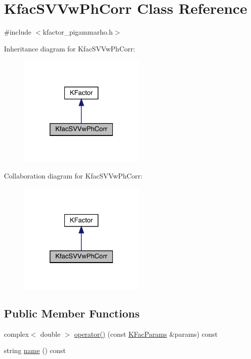 \hypertarget{classKfacSVVwPhCorr}{}\section{Kfac\+S\+V\+Vw\+Ph\+Corr Class Reference}
\label{classKfacSVVwPhCorr}


{\ttfamily \#include $<$kfactor\+\_\+pigammarho.\+h$>$}



Inheritance diagram for Kfac\+S\+V\+Vw\+Ph\+Corr\+:
\nopagebreak
\begin{figure}[H]
\begin{center}
\leavevmode
\includegraphics[width=175pt]{d2/d39/classKfacSVVwPhCorr__inherit__graph}
\end{center}
\end{figure}


Collaboration diagram for Kfac\+S\+V\+Vw\+Ph\+Corr\+:
\nopagebreak
\begin{figure}[H]
\begin{center}
\leavevmode
\includegraphics[width=175pt]{d9/df8/classKfacSVVwPhCorr__coll__graph}
\end{center}
\end{figure}
\subsection*{Public Member Functions}
\begin{DoxyCompactItemize}
\item 
complex$<$ double $>$ \mbox{\hyperlink{classKfacSVVwPhCorr_a16ca2be4bad507ad67ab2ce96f056917}{operator()}} (const \mbox{\hyperlink{classKFacParams}{K\+Fac\+Params}} \&params) const
\item 
string \mbox{\hyperlink{classKfacSVVwPhCorr_a390641d2f2f421a4d91caceff42d53e8}{name}} () const
\end{DoxyCompactItemize}


